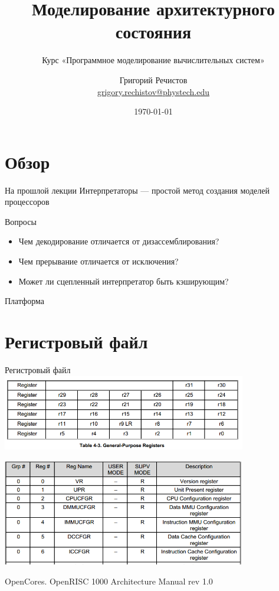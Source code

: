 \documentclass{beamer}
\title{Моделирование архитектурного состояния}
\subtitle{Курс «Программное моделирование вычислительных систем»}
\author[]{Григорий Речистов \\ \small{\href{mailto:grigory.rechistov@phystech.edu}{grigory.rechistov@phystech.edu}}}
\date{\today}
\begin{document}
\begin{frame}
    \maketitle
\end{frame}

\begin{frame}
    \tableofcontents
\end{frame}

\section*{Обзор}

\begin{frame}{На прошлой лекции}
Интерпретаторы — простой метод создания моделей процессоров

\end{frame}

\begin{frame}{Вопросы}
\begin{itemize}
\item Чем декодирование отличается от дизассемблирования? \pause
\item Чем прерывание отличается от исключения? \pause
\item Может ли сцепленный интерпретатор быть кэширующим?
\end{itemize}

\end{frame}


\begin{frame}{Платформа}
\centering
\vfill

\vfill

\end{frame}

\section{Регистровый файл}

\begin{frame}{Регистровый файл}
\centering
\includegraphics[width=0.8\textwidth]{or1k-gprs}

\includegraphics[width=0.8\textwidth]{or1k-sprs}

\tiny{OpenCores. OpenRISC 1000 Architecture Manual rev 1.0}
\end{frame}
\end{document}
